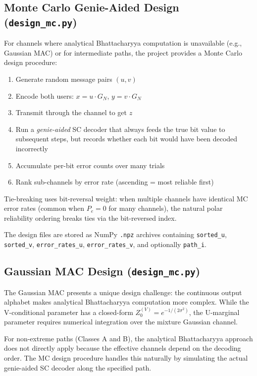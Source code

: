 \documentclass[11pt,a4paper]{article}
\begin{document}
\subsection{Monte Carlo Genie-Aided Design (\texttt{design\_mc.py})}

For channels where analytical Bhattacharyya computation is unavailable
(e.g., Gaussian MAC) or for intermediate paths, the project provides a
Monte Carlo design procedure:

\begin{enumerate}
  \item Generate random message pairs $(u, v)$
  \item Encode both users: $x = u \cdot G_N$, $y = v \cdot G_N$
  \item Transmit through the channel to get $z$
  \item Run a \emph{genie-aided} SC decoder that always feeds the true bit value to subsequent steps, but records whether each bit would have been decoded incorrectly
  \item Accumulate per-bit error counts over many trials
  \item Rank sub-channels by error rate (ascending = most reliable first)
\end{enumerate}

Tie-breaking uses bit-reversal weight: when multiple channels have identical
MC error rates (common when $P_e = 0$ for many channels), the natural polar
reliability ordering breaks ties via the bit-reversed index.

The design files are stored as NumPy \texttt{.npz} archives containing
\texttt{sorted\_u}, \texttt{sorted\_v}, \texttt{error\_rates\_u},
\texttt{error\_rates\_v}, and optionally \texttt{path\_i}.

\subsection{Gaussian MAC Design (\texttt{design\_mc.py})}

The Gaussian MAC presents a unique design challenge: the continuous output
alphabet makes analytical Bhattacharyya computation more complex. While the
V-conditional parameter has a closed-form $Z_0^{(V)} = e^{-1/(2\sigma^2)}$,
the U-marginal parameter requires numerical integration over the mixture
Gaussian channel.

For non-extreme paths (Classes A and B), the analytical Bhattacharyya approach
does not directly apply because the effective channels depend on the decoding
order. The MC design procedure handles this naturally by simulating the
actual genie-aided SC decoder along the specified path.
\end{document}
